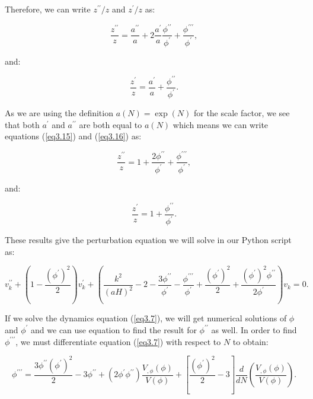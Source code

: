 \documentclass[a4paper,12pt,twoside]{report}
\begin{document}
Therefore, we can write $z^{\prime \prime}/z$ and $z^{\prime}/z$ as:

\begin{equation} \label{eq3.15}
\frac{z^{\prime \prime}}{z} = \frac{a^{\prime \prime}}{a} + 2 \frac{a^{\prime}}{a} \frac{\phi^{\prime \prime}}{\phi^{\prime}} + \frac{\phi^{\prime \prime \prime}}{\phi^{\prime}},
\end{equation}

and:

\begin{equation} \label{eq3.16}
\frac{z^{\prime}}{z} = \frac{a^{\prime}}{a} + \frac{\phi^{\prime \prime}}{\phi^{\prime}}.
\end{equation}

As we are using the definition $a(N) = \exp(N)$ for the scale factor, we see that both $a^{\prime}$ and $a^{\prime \prime}$ are both equal to $a(N)$ which means we can write equations (\ref{eq3.15}) and (\ref{eq3.16}) as:

\begin{equation} \label{eq3.17}
\frac{z^{\prime \prime}}{z} = 1 + \frac{2\phi^{ \prime \prime}}{\phi^{\prime}} + \frac{\phi^{\prime \prime \prime}}{\phi^{\prime}},
\end{equation}

and:

\begin{equation} \label{eq3.18}
\frac{z^{\prime}}{z} = 1 + \frac{\phi^{\prime \prime}}{\phi^{\prime}}.
\end{equation}

These results give the perturbation equation we will solve in our Python script as:

\begin{equation} \label{eq3.19}
v_{k}^{\prime \prime} + \left( 1 - \frac{(\phi^{\prime})^{2}}{2} \right)v_{k}^{\prime}+\left( \frac{k^{2}}{(aH)^{2}} - 2 - \frac{3\phi^{\prime \prime}}{\phi^{\prime}} - \frac{\phi^{\prime \prime \prime}}{\phi^{\prime}} + \frac{(\phi^{\prime })^{2}}{2} + \frac{(\phi^{\prime })^{2} \phi^{\prime \prime}}{2 \phi^{\prime}} \right)v_{k} = 0.
\end{equation}

If we solve the dynamics equation (\ref{eq3.7}), we will get numerical solutions of $\phi$ and $\phi^{\prime}$ and we can use equation to find the result for $\phi^{\prime \prime}$ as well. In order to find $\phi^{\prime \prime \prime}$, we must differentiate equation (\ref{eq3.7}) with respect to $N$ to obtain:

\begin{equation} \label{eq3.20}
\phi^{\prime \prime \prime} = \frac{3\phi^{\prime \prime}(\phi^{\prime})^{2}}{2} - 3\phi^{\prime \prime} + (2\phi^{\prime}\phi^{\prime \prime})\frac{V_{,\phi}(\phi)}{V(\phi)} + \left[ \frac{(\phi^{\prime})^{2}}{2} - 3 \right]\frac{d}{dN} \left( \frac{V_{,\phi}(\phi)}{V(\phi)} \right).
\end{equation}
\end{document}
